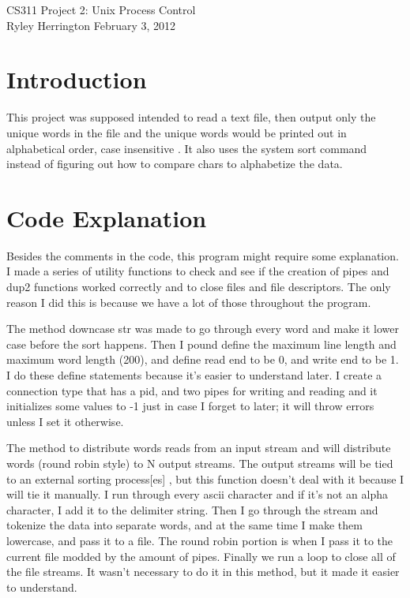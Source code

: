 \documentclass[letterpaper,10pt]{article}
\begin{document}
\begin{center}
{\large CS311 Project 2: Unix Process Control} \\ %
Ryley Herrington
February 3, 2012
\end{center}

\section{Introduction}
This project was supposed intended to read a text file, then output only the unique words in the file and the unique words would be printed out in alphabetical order, case insensitive   . It also uses the system sort command instead of figuring out how to compare chars to alphabetize the data. 

\section{Code Explanation}
Besides the comments in the code, this program might require some explanation. I made a series of utility functions to check and see if the creation of pipes and dup2 functions worked correctly and to close files and file descriptors. The only reason I did this is because we have a lot of those throughout the program. 

The method downcase str was made to go through every word and make it lower case before the sort happens. Then I pound define the maximum line length and maximum word length (200), and define read end to be 0, and write end to be 1. I do these define statements because it's easier to understand later. I create a connection type that has a pid, and two pipes for writing and reading and it initializes some values to -1 just in case I forget to later; it will throw errors unless I set it otherwise. 

The method to distribute words reads from an input stream and will distribute words (round robin style) to N output streams. The output streams will be tied to an external sorting process[es] , but this function doesn't deal with it because I will tie it manually. I run through every ascii character and if it's not an alpha character, I add it to the delimiter string. Then I go through the stream and tokenize the data into separate words, and at the same time I make them lowercase, and pass it to a file. The round robin portion is when I pass it to the current file modded by the amount of pipes. Finally we run a loop to close all of the file streams. It wasn't necessary to do it in this method, but it made it easier to understand. 
\end{document}

